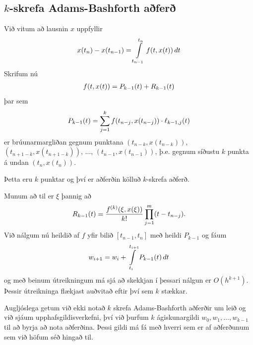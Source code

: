 \documentclass[letterpaper,10pt,icelandic]{sphinxmanual}
\begin{document}

\subsection{\(k\)-skrefa Adams-Bashforth aðferð}
\label{kafli06:index-17}\label{kafli06:skrefa-adams-bashforth-afer}
Við vitum að lausnin \(x\) uppfyllir
\begin{gather}
\begin{split}x(t_{n}) - x(t_{n-1}) =
  \int\limits_{t_{n-1}}^{t_n} f(t,x(t)) \, dt\end{split}\notag
\end{gather}
Skrifum nú
\begin{gather}
\begin{split}f(t,x(t)) = P_{k-1}(t) + R_{k-1}(t)\end{split}\notag
\end{gather}
þar sem
\begin{gather}
\begin{split}P_{k-1}(t) = \sum\limits_{j=1}^k f(t_{n-j},x(t_{n-j})) \cdot
  \ell_{k-1,j}(t)\end{split}\notag
\end{gather}
er brúunarmargliðan gegnum punktana \((t_{n-k},x(t_{n-k}))\),
\((t_{n+1-k},x(t_{n+1-k}))\), \(\ldots\),
\((t_{n-1},x(t_{n-1}))\), þ.e. gegnum síðustu \(k\) punkta á
undan \((t_n,x(t_n))\).

Þetta eru \(k\) punktar og því er aðferðin kölluð \(k\)-skrefa
aðferð.

Munum að til er \(\xi\) þannig að
\begin{gather}
\begin{split}R_{k-1}(t) = \frac{f^{(k)}(\xi,x(\xi))}{k!}
  \prod\limits_{j=1}^m (t-t_{n-j}).\end{split}\notag
\end{gather}
Við nálgum nú heildið af \(f\) yfir bilið \([t_{n-1},t_n]\) með
heildi \(P_{k-1}\) og fáum
\begin{gather}
\begin{split}w_{i+1} = w_i +
  \int\limits_{t_i}^{t_{i+1}} P_{k-1}(t) \, dt\end{split}\notag
\end{gather}
og með beinum útreikningum má sjá að skekkjan í þessari nálgun er
\(O(h^{k+1})\). Þessir útreikninga flækjast auðvitað eftir því sem
\(k\) stækkar.

Augljóslega getum við ekki notað \(k\) skrefa Adams-Bashforth
aðferðir um leið og við sjáum upphafsgildisverkefni, því við þurfum
\(k\) ágiskunargildi \(w_0, w_1, \ldots, w_{k-1}\) til að byrja
að nota aðferðina. Þessi gildi má fá með hverri sem er af aðferðunum sem
við höfum séð hingað til.
\end{document}
